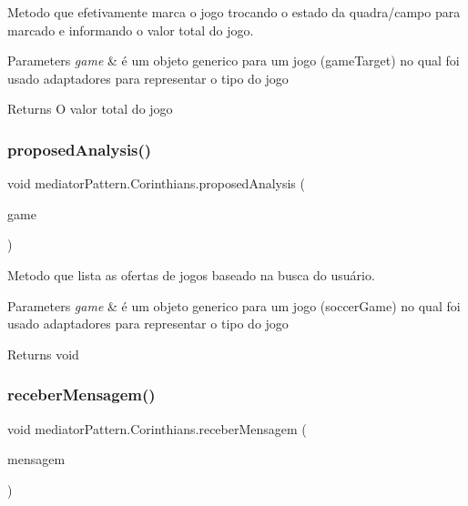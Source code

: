 Metodo que efetivamente marca o jogo trocando o estado da quadra/campo para marcado e informando o valor total do jogo. 


\begin{DoxyParams}{Parameters}
{\em game} & é um objeto generico para um jogo (game\+Target) no qual foi usado adaptadores para representar o tipo do jogo \\
\hline
\end{DoxyParams}
\begin{DoxyReturn}{Returns}
O valor total do jogo 
\end{DoxyReturn}
\mbox{\label{classmediator_pattern_1_1_corinthians_a22f96b98b3eb3c030c46c40641a4e782}} 
\subsubsection{\texorpdfstring{proposedAnalysis()}{proposedAnalysis()}}
{\footnotesize\ttfamily void mediator\+Pattern.\+Corinthians.\+proposed\+Analysis (\begin{DoxyParamCaption}\item[{\mbox{\hyperlink{classtemplate_pattern_1_1soccer_game}{soccer\+Game}}}]{game }\end{DoxyParamCaption})}



Metodo que lista as ofertas de jogos baseado na busca do usuário. 


\begin{DoxyParams}{Parameters}
{\em game} & é um objeto generico para um jogo (soccer\+Game) no qual foi usado adaptadores para representar o tipo do jogo \\
\hline
\end{DoxyParams}
\begin{DoxyReturn}{Returns}
void 
\end{DoxyReturn}
\mbox{\label{classmediator_pattern_1_1_corinthians_a53bb404236663d65e9c6362cd2623ebd}} 
\subsubsection{\texorpdfstring{receberMensagem()}{receberMensagem()}}
{\footnotesize\ttfamily void mediator\+Pattern.\+Corinthians.\+receber\+Mensagem (\begin{DoxyParamCaption}\item[{String}]{mensagem }\end{DoxyParamCaption})}



